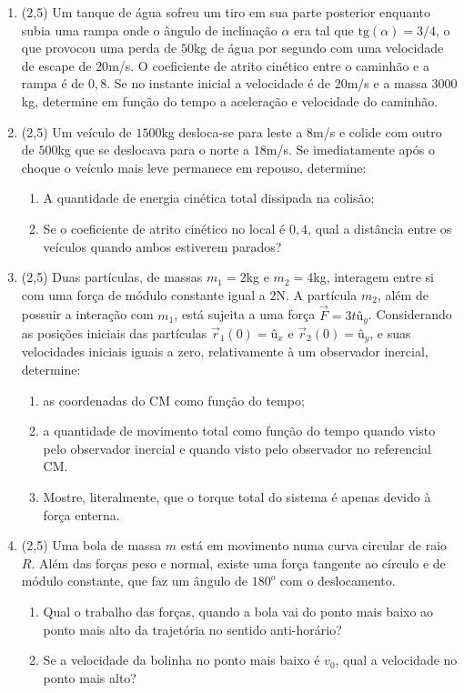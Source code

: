 \documentclass[12pt,a4paper]{article}
\begin{document}
\begin{enumerate}
\item (2,5) Um tanque de água sofreu um tiro em sua parte posterior enquanto subia uma rampa onde o ângulo de inclinação $\alpha$
era tal que $\textrm{tg}(\alpha)=3/4$, o que provocou uma perda de $50$kg de água por segundo com uma velocidade de escape
de $20$m/s. O coeficiente de atrito cinético entre o caminhão e a rampa é de $0,8$. Se no instante inicial a velocidade é de 
$20$m/s e a massa $3000$kg, determine em função do tempo a aceleração e velocidade do caminhão.

\item (2,5) Um veículo de $1500$kg desloca-se para leste a $8$m/s e colide com outro de $500$kg que se deslocava para o norte a $18$m/s. 
Se imediatamente após o choque o veículo mais leve permanece em repouso, determine:
\begin{enumerate}[label=\alph*)]
\item A quantidade de energia cinética total dissipada na colisão;
\item Se o coeficiente de atrito cinético no local é $0,4$, qual a distância entre os veículos quando ambos estiverem parados?
\end{enumerate}

\item (2,5) Duas partículas, de massas $m_1=2$kg e $m_2=4$kg, interagem entre si com uma força de módulo constante igual a $2$N. A 
partícula $m_2$, além de possuir a interação com $m_1$, está sujeita a uma força $\overrightarrow{F}=3t\textrm{û}_y$.
Considerando as posições iniciais das partículas $\overrightarrow{r}_1(0)=\textrm{û}_x$ e $\overrightarrow{r}_2(0)=\textrm{û}_y$, 
e suas velocidades iniciais iguais a zero, relativamente à um observador inercial, determine:
\begin{enumerate}[label=\alph*)]
\item as coordenadas do CM como função do tempo;
\item a quantidade de movimento total como função do tempo quando visto pelo observador inercial e quando visto pelo observador 
no referencial CM.
\item Mostre, literalmente, que o torque total do sistema é apenas devido à força enterna. 
\end{enumerate}

\item (2,5) Uma bola de massa $m$ está em movimento numa curva circular de raio $R$. Além das forças peso e normal, existe 
uma força tangente ao círculo e de módulo constante, que faz um ângulo de $180^o$ com o deslocamento.

\begin{enumerate}[label=\alph*)]
\item Qual o trabalho das forças, quando a bola vai do ponto mais baixo ao ponto mais alto da trajetória no sentido anti-horário?
\item Se a velocidade da bolinha no ponto mais baixo é $v_0$, qual a velocidade no ponto mais alto?
\end{enumerate}

\end{enumerate}
\end{document}
